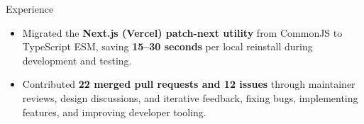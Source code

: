 \documentclass{resume}
\begin{document}
\begin{experienceSection}{Experience}
    \experienceItem[
        company={\textbf{Open Source} | Remote | Software Contributor},
        location={},
        position={},
        duration={July 2025 - May 2026}
    ]

    \begin{itemize}
        \itemsep -6pt {}

        \item Migrated the \textbf{Next.js (Vercel) patch-next utility} from CommonJS to TypeScript ESM, saving \textbf{15--30 seconds} per local reinstall during development and testing.

        \item Contributed \textbf{22 merged pull requests and 12 issues} through maintainer reviews, design discussions, and iterative feedback, fixing bugs, implementing features, and improving developer tooling.

    \end{itemize}

\end{experienceSection}
\end{document}
